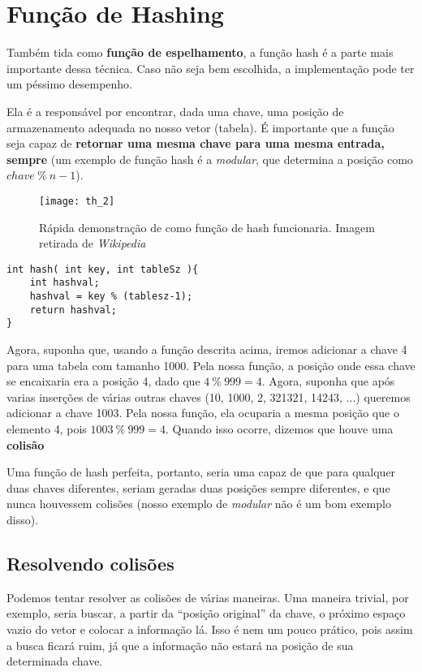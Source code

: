 \documentclass[12pt, a4paper]{article}
\begin{document}
\section{Função de Hashing}
\label{sec:hash}

Também tida como \textbf{função de espelhamento}, a função hash é a parte mais importante dessa técnica. Caso não seja bem escolhida, a implementação pode ter um péssimo desempenho.

Ela é a responsável por encontrar, dada uma chave, uma posição de armazenamento adequada no nosso vetor (tabela). É importante que a função seja capaz de \textbf{retornar uma mesma chave para uma mesma entrada, sempre} (um exemplo de função hash é a \textit{modular}, que determina a posição como $chave~\%~n-1$). 

\begin{figure}[!h]
\centering
\texttt{[image: th\_2]}
\caption{Rápida demonstração de como função de hash funcionaria. Imagem retirada de \textit{Wikipedia}\cite{wiki:hash}}
\label{hash2}
\end{figure}

\begin{lstlisting}[frame=single, captionpos=b]
int hash( int key, int tableSz ){
	int hashval;
	hashval = key % (tablesz-1);
	return hashval;
}
\end{lstlisting}

Agora, suponha que, usando a função descrita acima, iremos adicionar a chave 4 para uma tabela com tamanho 1000. Pela nossa função, a posição onde essa chave se encaixaria era a posição 4, dado que $4~\%~999 = 4$. Agora, suponha que após varias inserções de várias outras chaves (10, 1000, 2, 321321, 14243, ...) queremos adicionar a chave 1003. Pela nossa função, ela ocuparia a mesma posição que o elemento 4, pois $1003~\%~999 = 4$. Quando isso ocorre, dizemos que houve uma \textbf{colisão}

Uma função de hash perfeita, portanto, seria uma capaz de que para qualquer duas chaves diferentes, seriam geradas duas posições sempre diferentes, e que nunca houvessem colisões (nosso exemplo de \textit{modular} não é um bom exemplo disso).

\subsection{Resolvendo colisões}
Podemos tentar resolver as colisões de várias maneiras. Uma maneira trivial, por exemplo, seria buscar, a partir da ``posição original'' da chave, o próximo espaço vazio do vetor e colocar a informação lá. Isso é nem um pouco prático, pois assim a busca ficará ruim, já que a informação não estará na posição de sua determinada chave.
\end{document}

